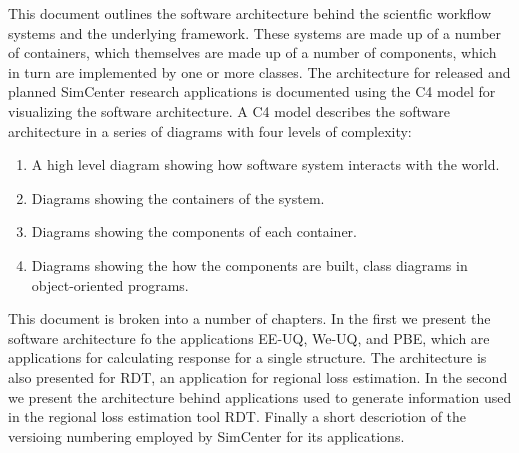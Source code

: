  This document outlines the software architecture behind the scientfic workflow systems  and the underlying framework.  These systems are made up of a number of containers, which themselves are made up of a number of components, which in turn are implemented by one or more classes. The architecture for released and planned SimCenter research applications is documented using the C4 model for visualizing the software architecture. A C4 model describes the software architecture in a series of diagrams with four levels of complexity:
\begin{enumerate}
\item A high level diagram showing how software system interacts with the world.
\item Diagrams showing the containers of the system.
\item Diagrams showing the components of each container.
\item Diagrams showing the how the components are built, class diagrams in object-oriented programs.
\end{enumerate}

This document is broken into a number of chapters. In the first we present the software architecture fo the applications EE-UQ, We-UQ, and PBE, which are applications for calculating response for a single structure. The architecture is also presented for RDT, an application for regional loss estimation. In the second we present the architecture behind applications used to generate information used in the regional loss estimation tool RDT. Finally a short descriotion of the versioing numbering employed by SimCenter for its applications. 

